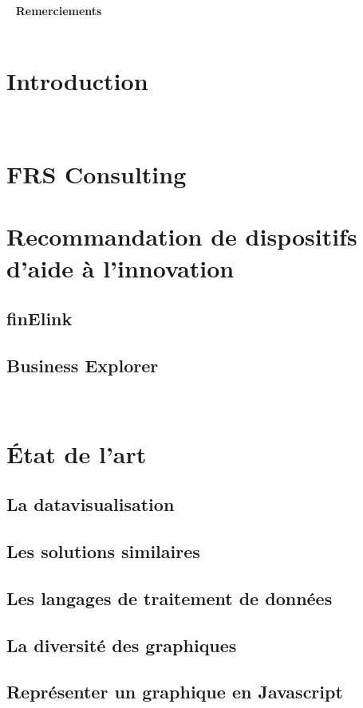 \documentclass[12pt,french,a4paper, oneside,openright]{report}
\begin{document}
\newpage
\ 
\newpage
{\color{red}\textbf{Remerciements}}\\

\newpage
\ 
\newpage
{}
\newpage
\ 
\newpage
\chapter{Introduction}

\newpage
\
\newpage
\chapter{FRS Consulting}


\chapter{Recommandation de dispositifs d'aide à l'innovation}
\section{finElink}

\section{Business Explorer}


\newpage
\ 
\newpage
\chapter{État de l'art}

\section{La datavisualisation}

\section{Les solutions similaires}

\section{Les langages de traitement de données}

\section{La diversité des graphiques}

\section{Représenter un graphique en Javascript}

\end{document}
